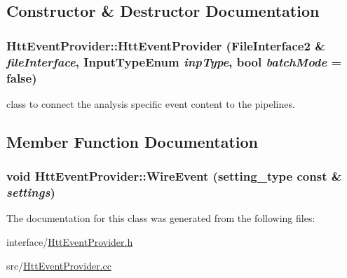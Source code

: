 \subsection{Constructor \& Destructor Documentation}
\hypertarget{classHttEventProvider_a74ad1777d344d990c91785c66fa9a952}{
\subsubsection[{HttEventProvider}]{\setlength{\rightskip}{0pt plus 5cm}HttEventProvider::HttEventProvider (FileInterface2 \& {\em fileInterface}, \/  InputTypeEnum {\em inpType}, \/  bool {\em batchMode} = {\ttfamily false})}}
\label{classHttEventProvider_a74ad1777d344d990c91785c66fa9a952}


class to connect the analysis specific event content to the pipelines. 

\subsection{Member Function Documentation}
\hypertarget{classHttEventProvider_a6f1f9729b3200ed6af1bec40ddae060a}{
\subsubsection[{WireEvent}]{\setlength{\rightskip}{0pt plus 5cm}void HttEventProvider::WireEvent ({\bf setting\_\-type} const \& {\em settings})}}
\label{classHttEventProvider_a6f1f9729b3200ed6af1bec40ddae060a}


The documentation for this class was generated from the following files:\begin{DoxyCompactItemize}
\item 
interface/\hyperlink{HttEventProvider_8h}{HttEventProvider.h}\item 
src/\hyperlink{HttEventProvider_8cc}{HttEventProvider.cc}\end{DoxyCompactItemize}
